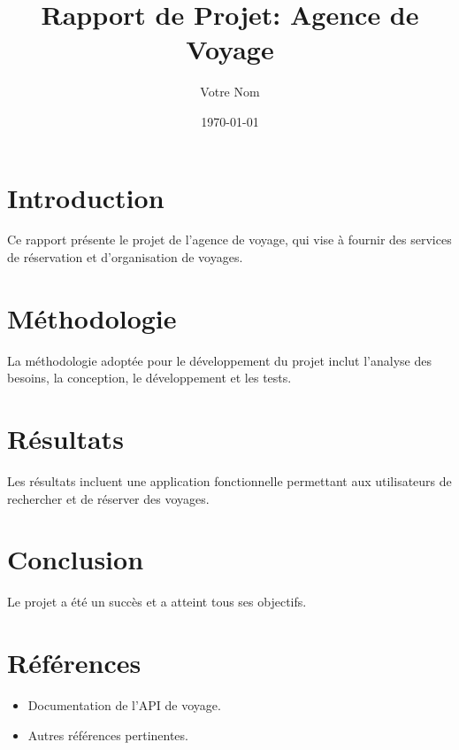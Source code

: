 \documentclass{article}
\title{Rapport de Projet: Agence de Voyage}
\author{Votre Nom}
\date{\today}
\begin{document}
\maketitle

\tableofcontents

\section{Introduction}
Ce rapport présente le projet de l'agence de voyage, qui vise à fournir des services de réservation et d'organisation de voyages.

\section{Méthodologie}
La méthodologie adoptée pour le développement du projet inclut l'analyse des besoins, la conception, le développement et les tests.

\section{Résultats}
Les résultats incluent une application fonctionnelle permettant aux utilisateurs de rechercher et de réserver des voyages.

\section{Conclusion}
Le projet a été un succès et a atteint tous ses objectifs.

\section{Références}
\begin{itemize}
    \item Documentation de l'API de voyage.
    \item Autres références pertinentes.
\end{itemize}
\end{document}
